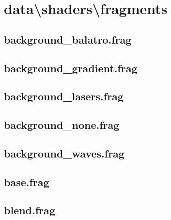 \documentclass[../main/main.tex]{subfiles}
\begin{document}
\section{data\textbackslash shaders\textbackslash fragments}
\subsection{background\_balatro.frag}

\label{src:data/shaders/fragments/background_balatro.frag}

\subsection{background\_gradient.frag}

\label{src:data/shaders/fragments/background_gradient.frag}

\subsection{background\_lasers.frag}

\label{src:data/shaders/fragments/background_lasers.frag}

\subsection{background\_none.frag}

\label{src:data/shaders/fragments/background_none.frag}

\subsection{background\_waves.frag}

\label{src:data/shaders/fragments/background_waves.frag}

\subsection{base.frag}

\label{src:data/shaders/fragments/base.frag}

\subsection{blend.frag}

\label{src:data/shaders/fragments/blend.frag}
\end{document}
